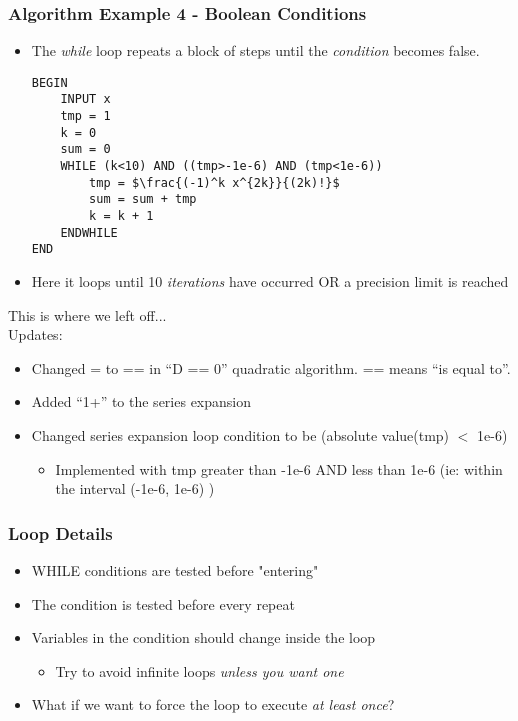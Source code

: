 \documentclass[14pt]{beamer}
\begin{document}
\begin{frame}[fragile]
\frametitle{Algorithm Example 4 - Boolean Conditions}
\begin{itemize}
\item The \textit{while} loop repeats a block of steps until the \textit{condition} becomes false.

\begin{lstlisting}[style=pseudo,mathescape=true,basicstyle=\ttfamily\scriptsize]
BEGIN
	INPUT x
	tmp = 1
	k = 0
	sum = 0
	WHILE (k<10) AND ((tmp>-1e-6) AND (tmp<1e-6)) 
		tmp = $\frac{(-1)^k x^{2k}}{(2k)!}$
		sum = sum + tmp
		k = k + 1
	ENDWHILE 
END
\end{lstlisting}

\item Here it loops until 10 \textit{iterations} have occurred OR a precision limit is reached
\end{itemize}
\end{frame}

\begin{frame}
This is where we left off...\\
Updates:
\begin{itemize}
\item Changed = to == in ``D == 0'' quadratic algorithm. == means ``is equal to''.
\item Added ``1+'' to the series expansion
\item Changed series expansion loop condition to be (absolute value(tmp) $<$ 1e-6)
	\begin{itemize}
		\item Implemented with tmp greater than -1e-6 AND less than 1e-6 (ie: within the interval (-1e-6, 1e-6) )
	\end{itemize}

\end{itemize}
\end{frame}

\begin{frame}
\frametitle{Loop Details}
\begin{itemize}
\item WHILE conditions are tested before "entering"
\item The condition is tested before every repeat
\item Variables in the condition should change inside the loop
	\begin{itemize}
		\item Try to avoid infinite loops \textit{unless you want one}
	\end{itemize}
\item What if we want to force the loop to execute \textit{at least once}?
\end{itemize}
\end{frame}
\end{document}
